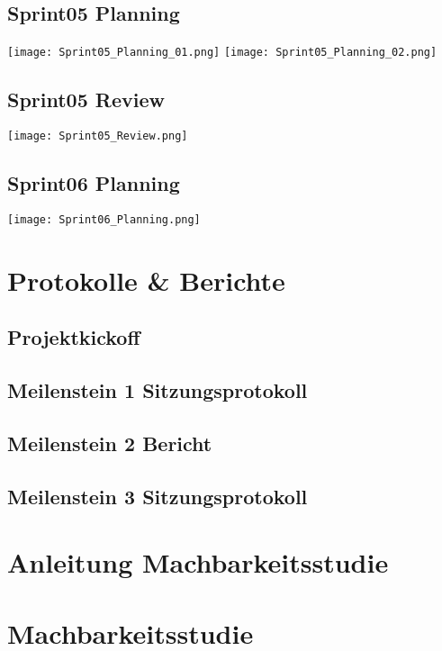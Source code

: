 \newpage
\section*{Sprint05 Planning}
\texttt{[image: Sprint05\_Planning\_01.png]}
\newpage
\noindent
\texttt{[image: Sprint05\_Planning\_02.png]}

\newpage
\section*{Sprint05 Review}
\texttt{[image: Sprint05\_Review.png]}

\newpage
\section*{Sprint06 Planning}
\texttt{[image: Sprint06\_Planning.png]}

\chapter{Protokolle \& Berichte}
\section{Projektkickoff}
\label{app:sec:protokollKickoff}


\section{Meilenstein 1 Sitzungsprotokoll}


\section{Meilenstein 2 Bericht}

\section{Meilenstein 3 Sitzungsprotokoll}
\label{app:sec:protokollMeilenstein3}


\newpage
\chapter{Anleitung Machbarkeitsstudie}
\label{app:ch:AnleitungMachbarkeitsstudie}


\newpage
\chapter{Machbarkeitsstudie}
\label{app:ch:Machbarkeitsstudie}

